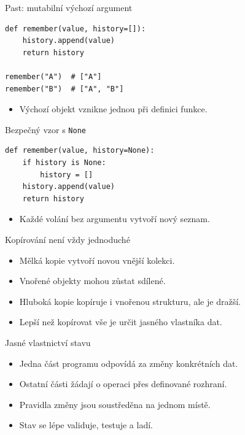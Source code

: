 \documentclass[aspectratio=169]{beamer}
\begin{document}
\begin{frame}[fragile]{Past: mutabilní výchozí argument}
\begin{lstlisting}[style=python]
def remember(value, history=[]):
    history.append(value)
    return history

remember("A")  # ["A"]
remember("B")  # ["A", "B"]
\end{lstlisting}
\begin{itemize}\item Výchozí objekt vznikne jednou při definici funkce.\end{itemize}
\end{frame}

\begin{frame}[fragile]{Bezpečný vzor s \texttt{None}}
\begin{lstlisting}[style=python]
def remember(value, history=None):
    if history is None:
        history = []
    history.append(value)
    return history
\end{lstlisting}
\begin{itemize}\item Každé volání bez argumentu vytvoří nový seznam.\end{itemize}
\end{frame}

\begin{frame}{Kopírování není vždy jednoduché}
\begin{itemize}
\item Mělká kopie vytvoří novou vnější kolekci.
\item Vnořené objekty mohou zůstat sdílené.
\item Hluboká kopie kopíruje i vnořenou strukturu, ale je dražší.
\item Lepší než kopírovat vše je určit jasného vlastníka dat.
\end{itemize}
\end{frame}

\begin{frame}{Jasné vlastnictví stavu}
\begin{itemize}
\item Jedna část programu odpovídá za změny konkrétních dat.
\item Ostatní části žádají o operaci přes definované rozhraní.
\item Pravidla změny jsou soustředěna na jednom místě.
\item Stav se lépe validuje, testuje a ladí.
\end{itemize}
\end{frame}
\end{document}
